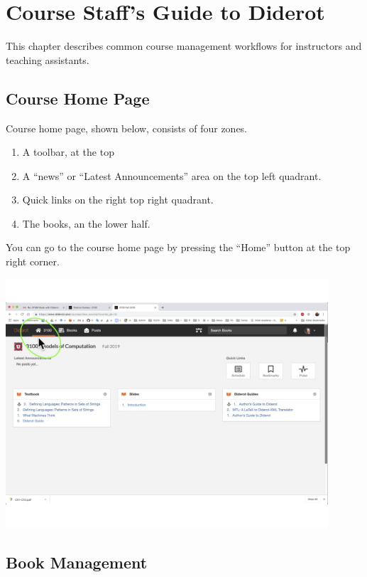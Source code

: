 \chapter{Course Staff's Guide to Diderot}
\label{ch:guide}

\begin{preamble}
This chapter describes common course management workflows for instructors and teaching assistants.
\end{preamble}


\section{Course Home Page}

\begin{gram}
Course home page, shown below, consists of four zones.
\begin{enumerate}
\item A toolbar, at the top
\item A ``news'' or ``Latest Announcements'' area on the top left quadrant.
\item Quick links on the right top right quadrant.
\item The books, an the lower half.
\end{enumerate}

You can go to the course home page by pressing the ``Home'' button at the top right corner.

\includegraphics[width=0.9\textwidth]{staff/media/course-home.jpg}
\end{gram}

\section{Book Management}

